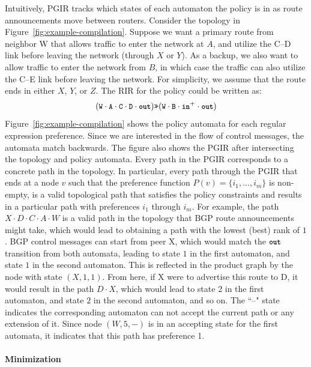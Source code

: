 \documentclass[10pt]{sigalternate052015}
\newcommand{\para}[1]{\paragraph*{\textbf{#1}}}
\newcommand{\set}[1]{\ensuremath{\{ #1 \} }}
\newcommand{\CD}[1]{\texttt{\small #1}}  %
\newcommand{\KW}[1]{\texttt{\small\bfseries{#1}}}
\newcommand{\Prefer}{\texttt{>>}}
\newcommand{\In}{\KW{in}}
\newcommand{\Out}{\KW{out}}
\begin{document}
Intuitively, PGIR tracks which states of each automaton the policy is in as route announcements move between routers.
%
Consider the topology in Figure~\ref{fig:example-compilation}. Suppose we want a primary route from neighbor W that allows traffic to enter the network at $A$, and utilize the C--D link before leaving the network (through $X$ or $Y$). As a backup, we also want to allow traffic to enter the network from $B$, in which case the traffic can also utilize the C--E link before leaving the network. For simplicity, we assume that the route ends in either $X$, $Y$, or $Z$. The RIR for the policy could be written as:
%
$$(\CD{W} \cdot \CD{A} \cdot \CD{C} \cdot \CD{D} \cdot \Out) \Prefer (\CD{W} \cdot \CD{B} \cdot \In^+ \cdot \Out)$$
%
Figure~\ref{fig:example-compilation} shows the policy automata for each regular expression preference. Since we are interested in the flow of control messages, the automata match backwards.
%
The figure also shows the PGIR after intersecting the topology and policy automata. Every path in the PGIR corresponds to a concrete path in the topology. In particular, every path through the PGIR that ends at a node $v$ such that the preference function $P(v) = \set{i_1, \dots, i_m}$ is non-empty, is a valid topological path that satisfies the policy constraints and results in a particular path with preferences $i_1$ through $i_m$.
%
For example, the path $X \cdot D \cdot C \cdot A \cdot W$ is a valid path in the topology that BGP route announcements might take, which would lead to obtaining a path with the lowest (best) rank of $1$.
BGP control messages can start from peer X, which would match the $\Out$ transition from both automata, leading to state $1$ in the first automaton, and state $1$ in the second automaton. This is reflected in the product graph by the node with state $(X,1,1)$. From here, if X were to advertise this route to D, it would result in the path $D \cdot X$, which would lead to state $2$ in the first automaton, and state $2$ in the second automaton, and so on.
%
The ``--" state indicates the corresponding automaton can not accept the current path or any extension of it. Since node $(W,5,-)$ is in an accepting state for the first automata, it indicates that this path has preference 1.

\para{Minimization}
\end{document}
